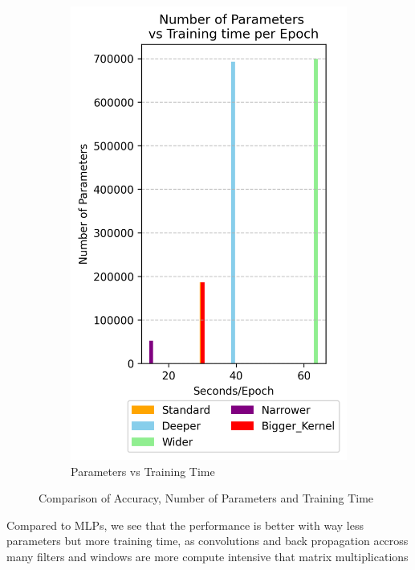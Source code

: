 \documentclass{article}
\begin{document}
\begin{figure}[h!]
\begin{subfigure}[t]{0.3\textwidth}
        \includegraphics[width=\textwidth]{./plots/plot15.png} %
        \caption{Parameters vs Training Time}
        \label{fig:plot16c}
    \end{subfigure}
    \caption{Comparison of Accuracy, Number of Parameters and Training Time}
    \label{fig:main_figure}
\end{figure}

Compared to MLPs, we see that the performance is better with way less parameters but more training time, as convolutions and back propagation accross many filters and windows are more compute intensive that matrix multiplications
\end{document}
